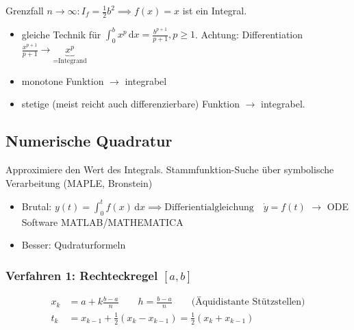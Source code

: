 Grenzfall \( n \rightarrow \infty : I_f = \frac{1}{2}b^2 \implies f(x) = x \) ist ein Integral.

\begin{note}
	\begin{itemize}
		\item gleiche Technik für \( \int_0^b x^p\,\mathrm{d}x= \frac{b^{p+1}}{p+1}, p \geq 1 \).
		\newline Achtung: Differentiation \( \frac{x^{p+1}}{p+1} \rightarrow \underbrace{x^p}_{=\text{Integrand}} \)
		\item monotone Funktion \( \rightarrow \) integrabel
		\item stetige (meist reicht auch differenzierbare) Funktion \( \rightarrow \) integrabel.
	\end{itemize}	
\end{note} 

\subsection{Numerische Quadratur}
Approximiere den Wert des Integrals. Stammfunktion-Suche über symbolische Verarbeitung (MAPLE, Bronstein)

\begin{itemize}
	\item Brutal: \( y(t) = \int_0^t f(x) \,\mathrm{d}x \implies \text{Differientialgleichung} \quad \dot{y} = f(t) \) \newline \( \rightarrow \) ODE Software MATLAB/MATHEMATICA
	\item Besser: Qudraturformeln
\end{itemize}

\subsubsection{Verfahren 1: Rechteckregel $[a,b]$}
\begin{align*}
	x_k &= a+ k \frac{b-a}{n} \qquad h= \frac{b-a}{n} \qquad \text{(Äquidistante Stützstellen)} \\
	t_k &= x_{k-1}+\frac{1}{2}(x_k-x_{k-1})= \frac{1}{2}(x_k+x_{k-1})
\end{align*}


